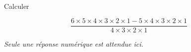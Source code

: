 Calculer

$$\frac{6\times 5 \times 4\times 3\times 2\times 1 - 5 \times 4\times 3\times 2\times 1}{4\times 3\times 2\times 1}$$

\emph{Seule une réponse numérique est attendue ici.}